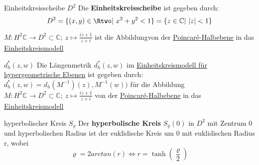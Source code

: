 \begin{titleDef}{Einheitskreisscheibe $D^2$}
\label{einheitskreisscheibeoff}
Die \textbf{Einheitskreisscheibe} ist gegeben durch:
$$D^2=\{(x,y)\in\Rtwo|\ x^2+y^2<1\}=\{z\in\mathbb{C}|\ \lvert z\rvert<1\}$$
\end{titleDef}

\begin{rawDef}
\label{uebergangPoincareEinheitskreis}
$M:H^2\mathbb{C}\to D^2\subset\mathbb{C};\: z\mapsto\frac{iz+1}{z+i}$ ist die Abbildungvon der \hyperref[hyperbolischpoincare]{Poincaré-Halbebene} in das \hyperref[hyperEinheitskreis]{Einheitskreismodell}
\end{rawDef}

\begin{rawDef}
$d_h^*(z,w)$
Die Längenmetrik $d_h^*(z,w)$ im \hyperref[hyperEinheitskreis]{Einheitskreismodell für hypergeometrische Ebenen} ist gegeben durch: \\$d_h^*(z,w)=d_h(M^{-1})(z),M^{-1}(w))$ für die Abbildung $M:H^2\mathbb{C}\to D^2\subset\mathbb{C};\: z\mapsto\frac{iz+1}{z+i}$ von der \hyperref[hyperbolischpoincare]{Poincaré-Halbebene} in das \hyperref[hyperEinheitskreis]{Einheitskreismodell}
\end{rawDef}

\begin{titleDef}{hyperbolischer Kreis $S_\varrho$}
Der \textbf{hyperbolische Kreis} $S_\varrho(0)$ in $D^2$ mit Zentrum 0 und hyperbolischen Radius ist der euklidische Kreis um 0 mit euklidischen Radius r, wobei
$$\varrho=2arctan(r)\Longleftrightarrow r=\tanh(\frac{\varrho}{2})$$
\end{titleDef}